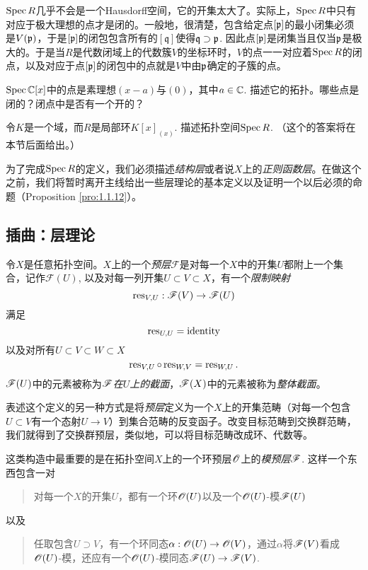 $\operatorname{Spec} R$几乎不会是一个Hausdorff空间，它的开集太大了。实际上，$\operatorname{Spec} R$中只有对应于极大理想的点才是闭的。一般地，很清楚，包含给定点$[\mathfrak{p}]$的最小闭集必须是$V(\mathfrak{p})$，于是$[\mathfrak{p}]$的闭包包含所有的$[\mathfrak{q}]$使得$\mathfrak{q}\supset\mathfrak{p}$. 因此点$[\mathfrak{p}]$是闭集当且仅当$\mathfrak{p}$是极大的。于是当$R$是代数闭域上的代数簇$V$的坐标环时，$V$的点一一对应着$\operatorname{Spec} R$的闭点，以及对应于点$[\mathfrak{p}]$的闭包中的点就是$V$中由$\mathfrak{p}$确定的子簇的点。

\begin{exe}
	\begin{compactenum}[{(a)}]
		\item $\operatorname{Spec} \mathbb{C}[x]$中的点是素理想$(x-a)$与$(0)$，其中$a\in\mathbb{C}$. 描述它的拓扑。哪些点是闭的？闭点中是否有一个开的？
		\item 令$K$是一个域，而$R$是局部环$K[x]_{(x)}$. 描述拓扑空间$\operatorname{Spec} R$. （这个的答案将在本节后面给出。）
	\end{compactenum}
\end{exe}

为了完成$\operatorname{Spec} R$的定义，我们必须描述\textit{结构层}或者说$X$上的\textit{正则函数层}。在做这个之前，我们将暂时离开主线给出一些层理论的基本定义以及证明一个以后必须的命题（Proposition \ref{pro:1.1.12}）。

\subsection{插曲：层理论}

令$X$是任意拓扑空间。$X$上的一个\textit{预层}$\mathscr{F}$是对每一个$X$中的开集$U$都附上一个集合，记作$\mathscr{F}(U)$, 以及对每一列开集$U\subset V\subset X$，有一个\textit{限制映射}
\[
	\operatorname{res}_{V,U}:\mathscr{F}(V)\to \mathscr{F}(U)
\]
满足
\[
	\operatorname{res}_{U,U}=\mathrm{identity}
\]
以及对所有$U\subset V\subset W\subset X$
\[
	\operatorname{res}_{V,U}\circ \operatorname{res}_{W,V}=\operatorname{res}_{W,U}.
\]
$\mathscr{F}(U)$中的元素被称为\textit{$\mathscr{F}$在$U$上的截面}，$\mathscr{F}(X)$中的元素被称为\textit{整体截面}。

表述这个定义的另一种方式是将\textit{预层}定义为一个$X$上的开集范畴（对每一个包含$U\subset V$有一个态射$U\to V$）到集合范畴的反变函子。改变目标范畴到交换群范畴，我们就得到了交换群预层，类似地，可以将目标范畴改成环、代数等。

这类构造中最重要的是在拓扑空间$X$上的一个环预层$\mathscr{O}$上的\textit{模预层}$\mathscr{F}$. 这样一个东西包含一对
\begin{quote}
对每一个$X$的开集$U$，都有一个环$\mathscr{O}(U)$以及一个$\mathscr{O}(U)$\hyp 模$\mathscr{F}(U)$
\end{quote}
以及
\begin{quote}
任取包含$U\supset V$，有一个环同态$\alpha:\mathscr{O}(U)\to\mathscr{O}(V)$，通过$\alpha$将$\mathscr{F}(V)$看成$\mathscr{O}(U)$\hyp 模，还应有一个$\mathscr{O}(U)$\hyp 模同态$\mathscr{F}(U)\to\mathscr{F}(V)$.
\end{quote}

